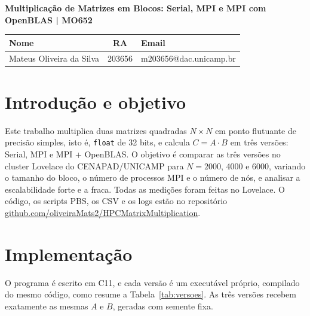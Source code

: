 \documentclass[Portugues]{ic-tese-v3}
\DeclareRobustCommand{\_}{\textunderscore\allowbreak} %
\begin{document}
\paginasiniciais
\pagestyle{fancy}\fancyhf{}\fancyfoot[C]{\thepage}\renewcommand{\headrulewidth}{0pt}\thispagestyle{fancy}
\vspace{-16mm}
\begin{center}
{\large\textbf{Multiplicação de Matrizes em Blocos: Serial, MPI e MPI com OpenBLAS | MO652}}\\[2mm]
\small
\begin{tabular}{|l||c||l|}
 \hline
 Nome & RA & Email \\
 \hline\hline
 Mateus Oliveira da Silva & 203656 & m203656@dac.unicamp.br \\
 \hline
\end{tabular}
\end{center}


\section{Introdução e objetivo}
Este trabalho multiplica duas matrizes quadradas $N\times N$ em ponto flutuante de precisão simples, isto é, \texttt{float} de 32 bits, e calcula $C = A\cdot B$ em três versões: Serial, MPI e MPI + OpenBLAS. O objetivo é comparar as três versões no cluster Lovelace do CENAPAD/UNICAMP para $N = 2000$, 4000 e 6000, variando o tamanho do bloco, o número de processos MPI e o número de nós, e analisar a escalabilidade forte e a fraca. Todas as medições foram feitas no Lovelace. O código, os scripts PBS, os CSV e os logs estão no repositório \href{https://github.com/oliveiraMats2/HPC_Matrix_Multiplication}{github.com/\allowbreak oliveiraMats2/\allowbreak HPC\_Matrix\_\allowbreak Multiplication}.

\section{Implementação}
O programa é escrito em C11, e cada versão é um executável próprio, compilado do mesmo código, como resume a Tabela~\ref{tab:versoes}. As três versões recebem exatamente as mesmas $A$ e $B$, geradas com semente fixa.
\end{document}
